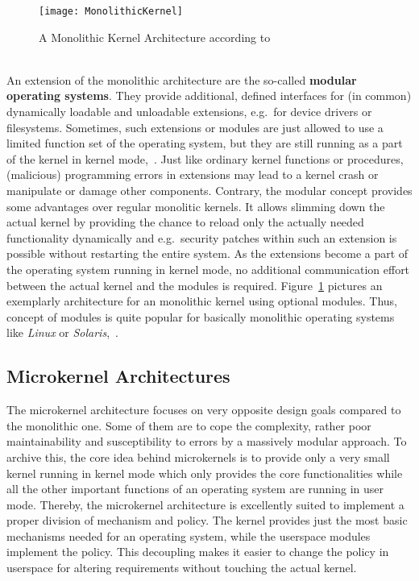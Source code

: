 \begin{figure} [ht]
	\centering
	\texttt{[image: MonolithicKernel]}
	\caption{A Monolithic Kernel Architecture according to~\cite{lfd430}}\label{pic:monolith}
\end{figure} \ \\
%
An extension of the monolithic architecture are the so-called \textbf{modular operating systems}.
They provide additional, defined interfaces for (in common) dynamically loadable and unloadable extensions, e.g.\ for device drivers or filesystems. 
Sometimes, such extensions or modules are just allowed to use a limited function set of the operating system, but they are still running as a part of the kernel in kernel mode\cite{lfd430},~\cite{tanenbaum-modern-operating-systems}. 
Just like ordinary kernel functions or procedures, (malicious) programming errors in extensions may lead to a kernel crash or manipulate or damage other components.
Contrary, the modular concept provides some advantages over regular monolitic kernels.
It allows slimming down the actual kernel by providing the chance to reload only the actually needed functionality dynamically and e.g.\ security patches within such an extension is possible without restarting the entire system\cite{brause2017betriebssysteme}.
As the extensions become a part of the operating system running in kernel mode, no additional communication effort between the actual kernel and the modules is required.
Figure~\ref{pic:monolith} pictures an exemplarly architecture for an monolithic kernel using optional modules.
Thus, concept of modules is quite popular for basically monolithic operating systems like \textit{Linux} or \textit{Solaris}\cite{brause2017betriebssysteme},~\cite{silberschatz2009operating}.

\subsection{Microkernel Architectures}\label{sec:microkernel-archs}
The microkernel architecture focuses on very opposite design goals compared to the monolithic one. 
Some of them are to cope the complexity, rather poor maintainability and susceptibility to errors by a massively modular approach. 
To archive this, the core idea behind microkernels is to provide only a very small kernel running in kernel mode which only provides the core functionalities while all the other important functions of an operating system are running in user mode.
Thereby, the microkernel architecture is excellently suited to implement a proper division of mechanism and policy.
The kernel provides just the most basic mechanisms needed for an operating system, while the userspace modules implement the policy.
This decoupling makes it easier to change the policy in userspace for altering requirements without touching the actual kernel\cite{tanenbaum-modern-operating-systems}.

